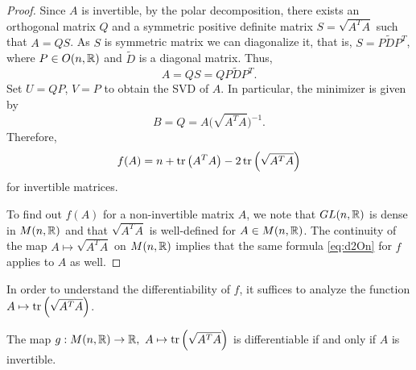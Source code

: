 \begin{proof}
\vspace{0.3cm}
\hf Since $A$ is invertible, by the polar decomposition, there exists an orthogonal matrix $Q$ and a symmetric positive definite matrix $S=\sqrt{A^TA}$ such that $A=QS$. As $S$ is symmetric matrix we can diagonalize it, that is, $S = P\tilde{D}P^T$, where $P\in O(n,\mathbb{R})$ and $\tilde{D}$ is a diagonal matrix. Thus,
\begin{displaymath}
    A = QS = Q P\tilde{D}P^T.
\end{displaymath}
Set $U=QP$, $V=P$ to obtain the SVD of $A$. In particular, the minimizer is given by
$$B=Q=A\big(\sqrt{A^TA}\big)^{-1}.$$
Therefore, 
	\begin{equation*}
		f(A) = n+\mathrm{tr}\left( A^TA \right)  - 2\,\mathrm{tr}\left( \sqrt{A^TA} \right)
	\end{equation*}
for invertible matrices. 

\vspace{0.3cm}
\hf To find out $f(A)$ for a non-invertible matrix $A$, we note that $GL(n,\mathbb{R})$ is dense in $M(n,\mathbb{R})$ and that $\sqrt{A^TA}$ is well-defined for $A\in M(n,\mathbb{R})$. The continuity of the map $A\mapsto \sqrt{A^T A}$ on $M(n,\mathbb{R})$ implies that the same formula \eqref{eq:d2On} for $f$ applies to $A$ as well. 
\end{proof}

\noindent In order to understand the differentiability of $f$, it suffices to analyze the function $A\mapsto \mathrm{tr}\left( \sqrt{A^TA} \right)$. 
\begin{lemma}
	The map $g : M(n,\mathbb{R})\to \mathbb{R}, ~A\mapsto \mathrm{tr}\left( \sqrt{A^TA} \right)$ is differentiable if and only if $A$ is invertible. 
\end{lemma}

